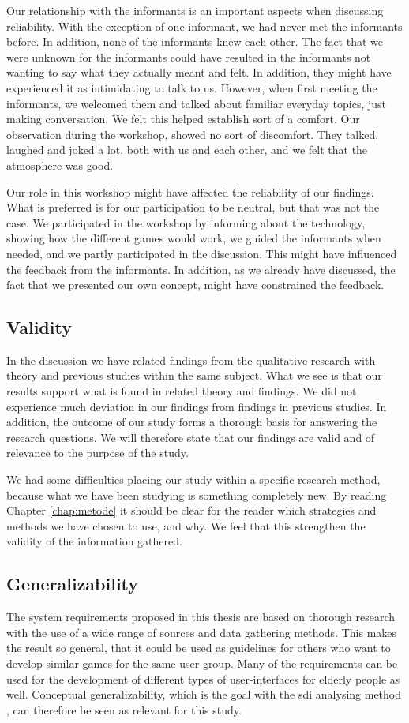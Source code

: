 Our relationship with the informants is an important aspects when discussing reliability. With the exception of one informant, we had never met the informants before. In addition, none of the informants knew each other. The fact that we were unknown for the informants could have resulted in the informants not wanting to say what they actually meant and felt. In addition, they might have experienced it as intimidating to talk to us. However, when first meeting the informants, we welcomed them and talked about familiar everyday topics, just making conversation. We felt this helped establish sort of a comfort. Our observation during the workshop, showed no sort of discomfort. They talked, laughed and joked a lot, both with us and each other, and we felt that the atmosphere was good. 

Our role in this workshop might have affected the reliability of our findings. What is preferred is for our participation to be neutral, but that was not the case. We participated in the workshop by informing about the technology, showing how the different games would work, we guided the informants when needed, and we partly participated in the discussion. This might have influenced the feedback from the informants. In addition, as we already have discussed, the fact that we presented our own concept, might have constrained the feedback. 


\subsection{Validity}

In the discussion we have related findings from the qualitative research with theory and previous studies within the same subject. What we see is that our results support what is found in related theory and findings. We did not experience much deviation in our findings from findings in previous studies. In addition, the outcome of our study forms a thorough basis for answering the research questions. We will therefore state that our findings are valid and of relevance to the purpose of the study. 

We had some difficulties placing our study within a specific research method, because what we have been studying is something completely new. By reading Chapter \ref{chap:metode} it should be clear for the reader which strategies and methods we have chosen to use, and why. We feel that this strengthen the validity of the information gathered. 
    
\subsection{Generalizability}    
The system requirements proposed in this thesis are based on thorough research with the use of a wide range of sources and data gathering methods. This makes the result so general, that it could be used as guidelines for others who want to develop similar games for the same user group. Many of the requirements can be used for the development of different types of user-interfaces for elderly people as well. Conceptual generalizability, which is the goal with the \ac{sdi} analysing method \cite{tjora}, can therefore be seen as relevant for this study. 

